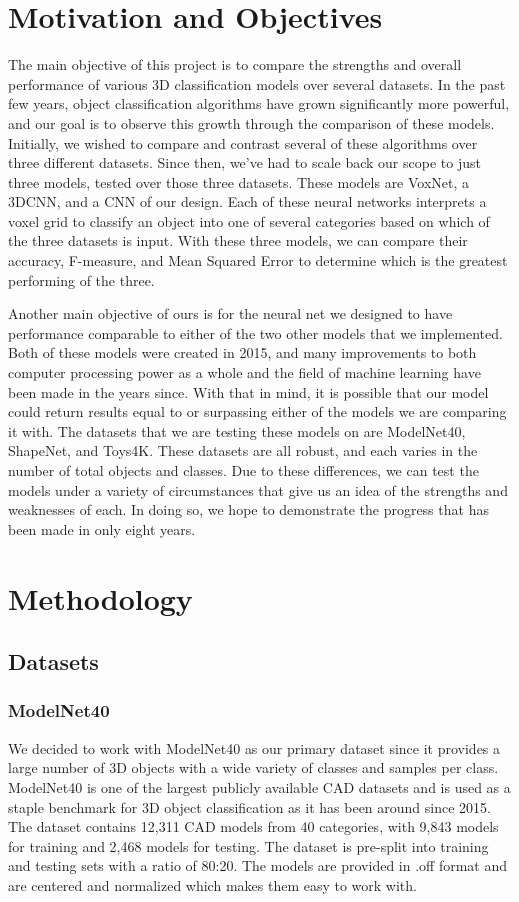 \documentclass[conference]{IEEEtran}
\begin{document}
\section{Motivation and Objectives}

The main objective of this project is to compare the strengths and overall performance of various 3D classification models over several datasets. In the past few years, object classification algorithms have grown significantly more powerful, and our goal is to observe this growth through the comparison of these models. Initially, we wished to compare and contrast several of these algorithms over three different datasets. Since then, we've had to scale back our scope to just three models, tested over those three datasets. These models are VoxNet, a 3DCNN, and a CNN of our design. Each of these neural networks interprets a voxel grid to classify an object into one of several categories based on which of the three datasets is input. With these three models, we can compare their accuracy, F-measure, and Mean Squared Error to determine which is the greatest performing of the three.

Another main objective of ours is for the neural net we designed to have performance comparable to either of the two other models that we implemented. Both of these models were created in 2015\cite{gwak20153d}\cite{7353481}, and many improvements to both computer processing power as a whole and the field of machine learning have been made in the years since. With that in mind, it is possible that our model could return results equal to or surpassing either of the models we are comparing it with. The datasets that we are testing these models on are ModelNet40, ShapeNet, and Toys4K. These datasets are all robust, and each varies in the number of total objects and classes. Due to these differences, we can test the models under a variety of circumstances that give us an idea of the strengths and weaknesses of each. In doing so, we hope to demonstrate the progress that has been made in only eight years.

\section{Methodology}

\subsection{Datasets}
\subsubsection{ModelNet40}
We decided to work with ModelNet40 \cite{7298801} as our primary dataset since it provides a large number of 3D objects with a wide variety of classes and samples per class. ModelNet40 is one of the largest publicly available CAD datasets and is used as a staple benchmark for 3D object classification as it has been around since 2015. The dataset contains 12,311 CAD models from 40 categories, with 9,843 models for training and 2,468 models for testing. The dataset is pre-split into training and testing sets with a ratio of 80:20. The models are provided in .off format and are centered and normalized which makes them easy to work with. 
\end{document}
